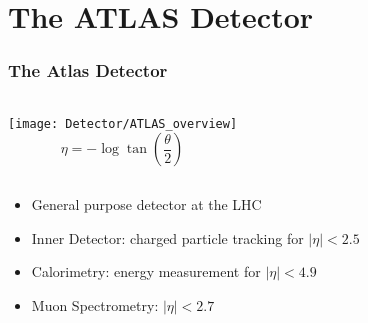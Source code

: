 \documentclass[10pt]{beamer}
\begin{document}
\section{The ATLAS Detector}
\begin{frame}\frametitle{The Atlas Detector} 
\begin{columns}
\texttt{[image: Detector/ATLAS\_overview]}
\begin{equation*}
\eta = - \log \tan \left(\frac{\theta}{2}\right)
\end{equation*}
\end{columns}
\begin{itemize}
\item General purpose detector at the LHC
\item Inner Detector: charged particle tracking for $|\eta| < 2.5$
\item Calorimetry: energy measurement for $|\eta| < 4.9$
\item Muon Spectrometry: $|\eta| < 2.7$
\end{itemize}
\end{frame}
\end{document}
